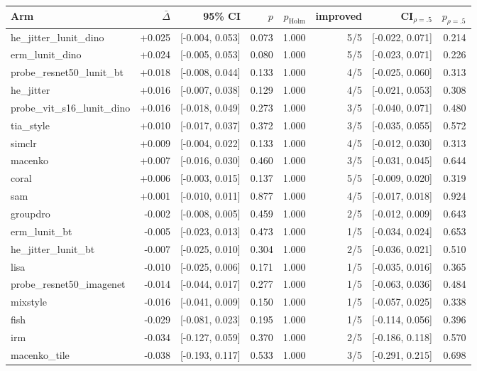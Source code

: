 \begin{tabular}{lrrrrrrr}
\toprule
Arm & $\bar\Delta$ & 95\% CI & $p$ & $p_\text{Holm}$ & improved & CI$_{\rho=.5}$ & $p_{\rho=.5}$ \\
\midrule
he\_jitter\_lunit\_dino & +0.025 & [-0.004, 0.053] & 0.073 & 1.000 & 5/5 & [-0.022, 0.071] & 0.214 \\
erm\_lunit\_dino & +0.024 & [-0.005, 0.053] & 0.080 & 1.000 & 5/5 & [-0.023, 0.071] & 0.226 \\
probe\_resnet50\_lunit\_bt & +0.018 & [-0.008, 0.044] & 0.133 & 1.000 & 4/5 & [-0.025, 0.060] & 0.313 \\
he\_jitter & +0.016 & [-0.007, 0.038] & 0.129 & 1.000 & 4/5 & [-0.021, 0.053] & 0.308 \\
probe\_vit\_s16\_lunit\_dino & +0.016 & [-0.018, 0.049] & 0.273 & 1.000 & 3/5 & [-0.040, 0.071] & 0.480 \\
tia\_style & +0.010 & [-0.017, 0.037] & 0.372 & 1.000 & 3/5 & [-0.035, 0.055] & 0.572 \\
simclr & +0.009 & [-0.004, 0.022] & 0.133 & 1.000 & 4/5 & [-0.012, 0.030] & 0.313 \\
macenko & +0.007 & [-0.016, 0.030] & 0.460 & 1.000 & 3/5 & [-0.031, 0.045] & 0.644 \\
coral & +0.006 & [-0.003, 0.015] & 0.137 & 1.000 & 5/5 & [-0.009, 0.020] & 0.319 \\
sam & +0.001 & [-0.010, 0.011] & 0.877 & 1.000 & 4/5 & [-0.017, 0.018] & 0.924 \\
groupdro & -0.002 & [-0.008, 0.005] & 0.459 & 1.000 & 2/5 & [-0.012, 0.009] & 0.643 \\
erm\_lunit\_bt & -0.005 & [-0.023, 0.013] & 0.473 & 1.000 & 1/5 & [-0.034, 0.024] & 0.653 \\
he\_jitter\_lunit\_bt & -0.007 & [-0.025, 0.010] & 0.304 & 1.000 & 2/5 & [-0.036, 0.021] & 0.510 \\
lisa & -0.010 & [-0.025, 0.006] & 0.171 & 1.000 & 1/5 & [-0.035, 0.016] & 0.365 \\
probe\_resnet50\_imagenet & -0.014 & [-0.044, 0.017] & 0.277 & 1.000 & 1/5 & [-0.063, 0.036] & 0.484 \\
mixstyle & -0.016 & [-0.041, 0.009] & 0.150 & 1.000 & 1/5 & [-0.057, 0.025] & 0.338 \\
fish & -0.029 & [-0.081, 0.023] & 0.195 & 1.000 & 1/5 & [-0.114, 0.056] & 0.396 \\
irm & -0.034 & [-0.127, 0.059] & 0.370 & 1.000 & 2/5 & [-0.186, 0.118] & 0.570 \\
macenko\_tile & -0.038 & [-0.193, 0.117] & 0.533 & 1.000 & 3/5 & [-0.291, 0.215] & 0.698 \\
\bottomrule
\end{tabular}
